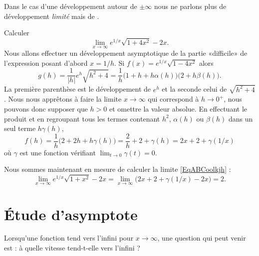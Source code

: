 Dans le cas d'une développement autour de \( \pm\infty\) nous ne parlons plus de développement \emph{limité} mais de .

\begin{example}	\label{ExBCDookjljhjk}
    Calculer
    \begin{equation}\label{EqABCoolkjh}
        \lim_{x\to \infty}  e^{1/x}\sqrt{1+4x^2}-2x.
    \end{equation}
    Nous allons effectuer un développement asymptotique de la partie «difficile» de l'expression posant d'abord $x=1/h$. Si $f(x)=e^{1/x}\sqrt{1-4x^2}$ alors
    \begin{equation}
	g(h)=\frac{1}{|h|}e^h\sqrt{h^2+4}=\frac{1}{h}\big(  1+h+h\alpha(h) \big)\big( 2+h\beta(h) \big).
    \end{equation}
    La première parenthèse est le développement de $e^h$ et la seconde celui de $\sqrt{h^2+4}$. Nous nous apprêtons à faire la limite $x\to\infty$ qui correspond à $h\to 0^+$, nous pouvons donc supposer que $h>0$ et omettre la valeur absolue. En effectuant le produit et en regroupant tous les termes contenant $h^2$, $\alpha(h)$ ou $\beta(h)$ dans un seul terme $h\gamma(h)$,
    \begin{equation}
	f(h)=\frac{1}{h}\big(  2+2h+h\gamma(h) \big)=\frac{2}{h}+2+\gamma(h)=2x+2+\gamma(1/x)
    \end{equation}
    où $\gamma$ est une fonction vérifiant $\lim_{t\to 0}\gamma(t)=0$.

    Nous sommes maintenant en mesure de calculer la limite \eqref{EqABCoolkjh} :
    \begin{equation}
	\lim_{x\to\infty}e^{1/x}\sqrt{1+x^2}-2x= \lim_{x\to \infty}\big(  2x+2+\gamma(1/x)-2x \big)=2.
    \end{equation}
\end{example}


\section{Étude d'asymptote}

Lorsqu'une fonction tend vers l'infini pour \( x\to \infty\), une question qui peut venir est : à quelle vitesse tend-t-elle vers l'infini ?

